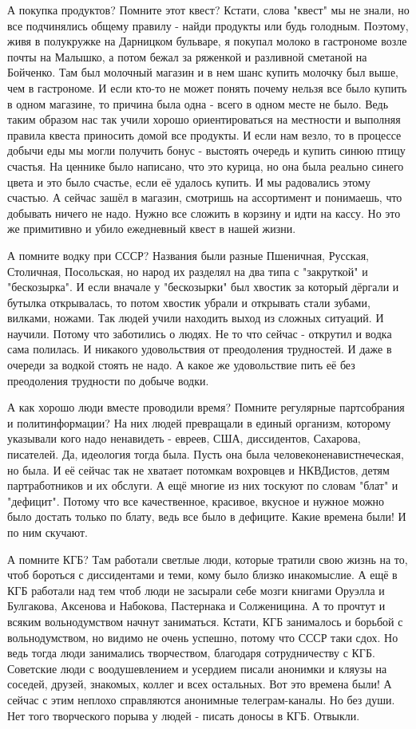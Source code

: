 А покупка продуктов? Помните этот квест? Кстати, слова "квест" мы не знали, но
все подчинялись общему правилу - найди продукты или будь голодным. Поэтому,
живя в полукружке на Дарницком бульваре, я покупал молоко в гастрономе возле
почты на Малышко, а потом бежал за ряженкой и разливной сметаной на Бойченко.
Там был  молочный магазин и в нем шанс купить молочку был выше, чем в
гастрономе. И если кто-то не может понять почему нельзя все было купить в одном
магазине, то причина была одна - всего в одном месте не было. Ведь таким
образом нас так учили хорошо ориентироваться на местности и выполняя правила
квеста приносить домой все продукты. И если нам везло, то в процессе добычи еды
мы могли получить бонус - выстоять очередь и купить синюю птицу счастья. На
ценнике было написано, что это курица, но она была реально синего цвета и это
было счастье, если её удалось купить. И мы радовались этому счастью. А сейчас
зашёл в магазин, смотришь на ассортимент и понимаешь, что добывать ничего не
надо. Нужно все сложить в корзину и идти на кассу. Но это же примитивно и убило
ежедневный квест в нашей жизни.

А помните водку при СССР? Названия были разные Пшеничная, Русская, Столичная,
Посольская, но народ их разделял на два типа с "закруткой" и "бескозырка". И
если вначале у "бескозырки" был хвостик за который дёргали и бутылка
открывалась, то потом хвостик убрали и открывать стали зубами, вилками, ножами.
Так людей учили находить выход из сложных ситуаций. И научили. Потому что
заботились о людях. Не то что сейчас - открутил и водка сама полилась. И
никакого удовольствия от преодоления трудностей. И даже в очереди за водкой
стоять не надо. А какое же удовольствие пить её без преодоления трудности по
добыче водки.

А как хорошо люди вместе проводили время? Помните регулярные партсобрания и
политинформации? На них людей превращали в единый организм, которому указывали
кого надо ненавидеть - евреев, США, диссидентов, Сахарова, писателей. Да,
идеология тогда была. Пусть она была человеконенавистнеческая, но была. И её
сейчас так не хватает потомкам вохровцев и НКВДистов, детям партработников и их
обслуги. А ещё многие из них тоскуют по словам "блат" и "дефицит". Потому что
все качественное, красивое, вкусное и нужное можно было достать только по
блату, ведь все было в дефиците. Какие времена были! И по ним скучают. 

А помните КГБ? Там работали светлые люди, которые тратили свою жизнь на то,
чтоб бороться с диссидентами и теми, кому было близко инакомыслие. А ещё в КГБ
работали над тем чтоб люди не засырали себе мозги книгами Оруэлла и Булгакова,
Аксенова и Набокова, Пастернака и Солженицина. А то прочтут и всяким
вольнодумством начнут заниматься. Кстати, КГБ занималось и борьбой с
вольнодумством, но видимо не очень успешно, потому что СССР таки сдох. Но ведь
тогда люди занимались творчеством, благодаря сотрудничеству с КГБ. Советские
люди с воодушевлением и усердием писали анонимки и кляузы на соседей, друзей,
знакомых, коллег и всех остальных. Вот это времена были! А сейчас с этим
неплохо справляются анонимные телеграм-каналы. Но без души. Нет того
творческого порыва у людей - писать доносы в КГБ. Отвыкли. 

